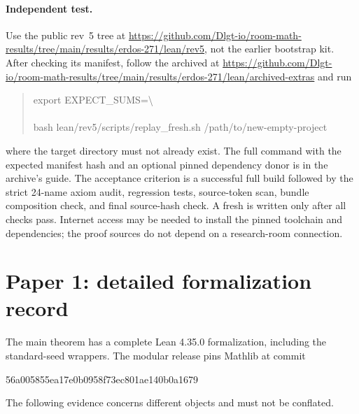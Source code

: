 \documentclass[11pt]{article}
\begin{document}
\paragraph{Independent test.}
Use the public rev~5 tree at
\url{https://github.com/Dlgt-io/room-math-results/tree/main/results/erdos-271/lean/rev5},
not the earlier bootstrap kit. After checking its manifest, follow the archived
 at
\url{https://github.com/Dlgt-io/room-math-results/tree/main/results/erdos-271/lean/archived-extras}
and run
\begin{quote}\ttfamily\small
export EXPECT\_SUMS=\textbackslash\\
\\
bash lean/rev5/scripts/replay\_fresh.sh /path/to/new-empty-project
\end{quote}
where the target directory must not already exist. The full command with the
expected manifest hash and an optional pinned dependency donor is in the
archive's guide. The acceptance criterion is a successful full build followed
by the strict 24-name axiom audit, regression tests, source-token scan, bundle
composition check, and final source-hash check. A fresh 
is written only after all checks pass. Internet access may be needed to install
the pinned toolchain and dependencies; the proof sources do not depend on a
research-room connection.

\section{Paper 1: detailed formalization record}
The main theorem has a complete Lean 4.35.0 formalization, including the standard-seed wrappers. The modular release pins Mathlib at commit
\begin{center}\small\ttfamily 56a005855ea17e0b0958f73ec801ae140b0a1679\end{center}
The following evidence concerns different objects and must not be conflated.
\end{document}
